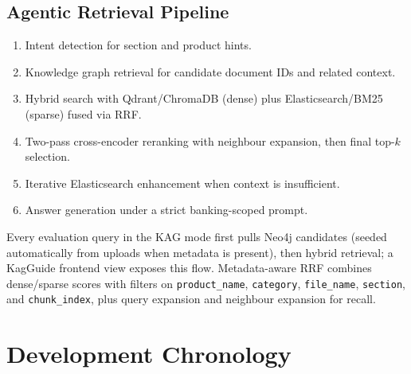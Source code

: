 \documentclass[11pt,a4paper]{article}
\begin{document}
\subsection{Agentic Retrieval Pipeline}
\begin{enumerate}[leftmargin=1.2cm]
    \item Intent detection for section and product hints.
    \item Knowledge graph retrieval for candidate document IDs and related context.
    \item Hybrid search with Qdrant/ChromaDB (dense) plus Elasticsearch/BM25 (sparse) fused via RRF.
    \item Two-pass cross-encoder reranking with neighbour expansion, then final top-$k$ selection.
    \item Iterative Elasticsearch enhancement when context is insufficient.
    \item Answer generation under a strict banking-scoped prompt.
\end{enumerate}

Every evaluation query in the KAG mode first pulls Neo4j candidates (seeded automatically from uploads when metadata is present), then hybrid retrieval; a KagGuide frontend view exposes this flow. Metadata-aware RRF combines dense/sparse scores with filters on \texttt{product\_name}, \texttt{category}, \texttt{file\_name}, \texttt{section}, and \texttt{chunk\_index}, plus query expansion and neighbour expansion for recall.

\section{Development Chronology}
\end{document}
